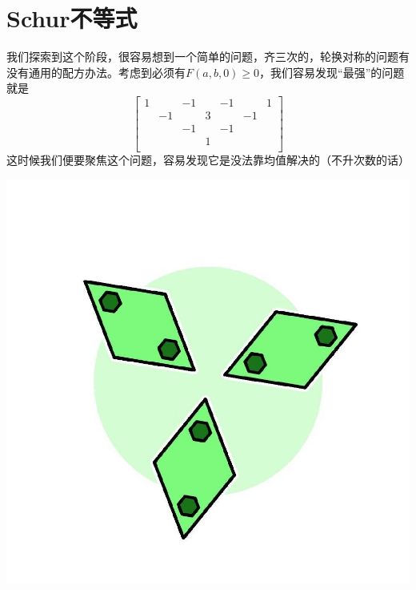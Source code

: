 \documentclass[UTF8]{ctexart}
\begin{document}
\section{Schur不等式}
我们探索到这个阶段，很容易想到一个简单的问题，齐三次的，轮换对称的问题有没有通用的配方办法。考虑到必须有$ F(a,b,0) \geq 0 $，我们容易发现“最强”的问题就是
\renewcommand*{\arraystretch}{1.732}\[\left[\begin{matrix}
	1& &-1& &-1& &1\\
	&-1& &3& &-1&\\
	& &-1& &-1& & \\
	& & &1& & &\\
\end{matrix}\right]\]
这时候我们便要聚焦这个问题，容易发现它是没法靠均值解决的（不升次数的话）
  \begin{center}
  	\includegraphics[width=0.4\linewidth]{210}
  \end{center}
  
\end{document}
